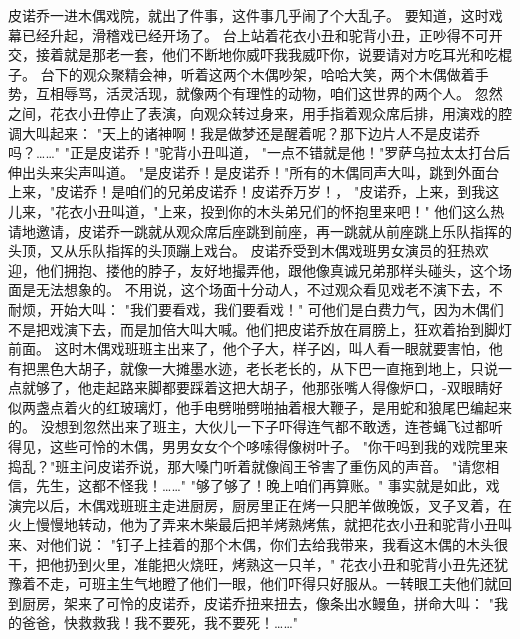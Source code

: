 \documentclass[12pt,UTF8]{ctexbook}
\begin{document}
皮诺乔一进木偶戏院，就出了件事，这件事几乎闹了个大乱子。
要知道，这时戏幕已经升起，滑稽戏已经开场了。
台上站着花衣小丑和驼背小丑，正吵得不可开交，接着就是那老一套，他们不断地你威吓我我威吓你，说要请对方吃耳光和吃棍子。
台下的观众聚精会神，听着这两个木偶吵架，哈哈大笑，两个木偶做着手势，互相辱骂，活灵活现，就像两个有理性的动物，咱们这世界的两个人。
忽然之间，花衣小丑停止了表演，向观众转过身来，用手指着观众席后排，用演戏的腔调大叫起来：
"天上的诸神啊！我是做梦还是醒着呢？那下边片人不是皮诺乔吗？……"
"正是皮诺乔！"驼背小丑叫道，
"一点不错就是他！"罗萨乌拉太太打台后伸出头来尖声叫道。
"是皮诺乔！是皮诺乔！"所有的木偶同声大叫，跳到外面台上来，"皮诺乔！是咱们的兄弟皮诺乔！皮诺乔万岁！，
"皮诺乔，上来，到我这儿来，"花衣小丑叫道，"上来，投到你的木头弟兄们的怀抱里来吧！"
他们这么热请地邀请，皮诺乔一跳就从观众席后座跳到前座，再一跳就从前座跳上乐队指挥的头顶，又从乐队指挥的头顶蹦上戏台。
皮诺乔受到木偶戏班男女演员的狂热欢迎，他们拥抱、搂他的脖子，友好地撮弄他，跟他像真诚兄弟那样头碰头，这个场面是无法想象的。
不用说，这个场面十分动人，不过观众看见戏老不演下去，不耐烦，开始大叫：
"我们要看戏，我们要看戏！"
可他们是白费力气，因为木偶们不是把戏演下去，而是加倍大叫大喊。他们把皮诺乔放在肩膀上，狂欢着抬到脚灯前面。
这时木偶戏班班主出来了，他个子大，样子凶，叫人看一眼就要害怕，他有把黑色大胡子，就像一大摊墨水迹，老长老长的，从下巴一直拖到地上，只说一点就够了，他走起路来脚都要踩着这把大胡子，他那张嘴人得像炉口，-双眼睛好似两盏点着火的红玻璃灯，他手电劈啪劈啪抽着根大鞭子，是用蛇和狼尾巴编起来的。
没想到忽然出来了班主，大伙儿一下子吓得连气都不敢透，连苍蝇飞过都听得见，这些可怜的木偶，男男女女个个哆嗦得像树叶子。
"你干吗到我的戏院里来捣乱？"班主问皮诺乔说，那大嗓门听着就像阎王爷害了重伤风的声音。
"请您相信，先生，这都不怪我！……"
"够了够了！晚上咱们再算账。"
事实就是如此，戏演完以后，木偶戏班班主走进厨房，厨房里正在烤一只肥羊做晚饭，叉子叉着，在火上慢慢地转动，他为了弄来木柴最后把羊烤熟烤焦，就把花衣小丑和驼背小丑叫来、对他们说：
"钉子上挂着的那个木偶，你们去给我带来，我看这木偶的木头很干，把他扔到火里，准能把火烧旺，烤熟这一只羊，"
花衣小丑和驼背小丑先还犹豫着不走，可班主生气地瞪了他们一眼，他们吓得只好服从。一转眼工夫他们就回到厨房，架来了可怜的皮诺乔，皮诺乔扭来扭去，像条出水鳗鱼，拼命大叫：
"我的爸爸，快救救我！我不要死，我不要死！……"

\chapter{}
\end{document}
